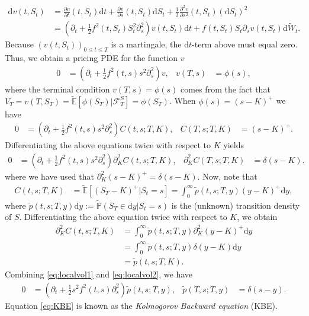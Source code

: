 \documentclass[12pt]{book}
\numberwithin{equation}{chapter}
\theoremstyle{plain}
\numberwithin{theorem}{section}
\theoremstyle{definition}
\numberwithin{exercise}{chapter}
\newcommand{\<}{\langle}
\renewcommand{\>}{\rangle}
\renewcommand{\(}{\left(}
\renewcommand{\)}{\right)}
\renewcommand{\[}{\left[}
\renewcommand{\]}{\right]}
\newcommand\Eb{\mathds{E}}
\newcommand\Pb{\mathds{P}}
\newcommand\Fc{\mathscr{F}}
\newcommand\del{\delta}
\newcommand\Ebt{\widetilde{\Eb}}
\newcommand\Pbt{\widetilde{\Pb}}
\newcommand\Wt{\widetilde{W}}
\renewcommand\d{\partial}
\newcommand\dd{\mathrm{d}}
\theoremstyle{definition}
\numberwithin{question}{section}
\newcommand\pt{\widetilde{p}}
\begin{document}
\begin{align}
\dd v(t,S_t) 
	&= \frac{\d v}{\d t} (t,S_t) \dd t + \frac{\d v}{\d s} (t,S_t) \dd S_t + \frac{1}{2} \frac{\d^2 v}{\d s^2}(t,S_t) ( \dd S_t )^2 \\
	&= \( \d_t + \frac{1}{2} f^2(t,S_t) S_t^2 \d_s^2 \) v(t,S_t) \dd t + f(t,S_t) S_t \d_s v(t,S_t) \dd \Wt_t .
\end{align}
Because $(v(t,S_t))_{0 \leq t \leq T}$ is a martingale, the $\dd t$-term above must equal zero. 
Thus, we obtain a pricing PDE for the function $v$
\begin{align}
0
	&=	\( \d_t + \frac{1}{2} f^2 (t,s) s^2 \d_s^2 \) v , &
v(T,s) 
	&= 	\phi(s) , \label{eq:local-vol-pde}
\end{align}
where the terminal condition $v(T,s) = \phi(s)$ comes from the fact that $V_T = v(T,S_T) = \Ebt[ \phi(S_T) | \Fc_T^S] = \phi(S_T)$.
When $\phi(s) = (s - K)^+$ we have  
\begin{align}
0
	&=	\( \d_t + \frac{1}{2} f^2 (t,s) s^2 \d_s^2 \) C(t,s;T,K) , &
C(T,s;T,K) 
	&= (s-K)^+.
\end{align}
Differentiating the above equations twice with respect to $K$ yields
\begin{align} \label{eq:localvol1}
0
	&=	\( \d_t + \frac{1}{2} f^2 (t,s) s^2 \d_s^2 \) \d_K^2 C(t,s;T,K) , &
\d_K^2 C(T,s;T,K) 
	&= \del (s-K) .
\end{align}
where we have used that $\d_K^2(s-K)^+ = \delta(s-K)$.
Now, note that 
\begin{align}
C(t,s;T,K)
	&= \Ebt [(S_T - K)^+ | S_t = s ]
	=		\int_0^\infty \pt (t,s;T,y) (y - K)^+ \dd y ,
\end{align}
where $\pt(t,s;T,y) \dd y := \Pbt (S_T \in \dd y | S_t = s )$ is the (unknown) transition density of $S$.
Differentiating the above equation twice with respect to $K$, we obtain
\begin{align} 
\d^2_K C(t,s;T,K) 
	&= \int_0^\infty \pt(t,s;T,y) \d_K^2 (y-K)^+ \dd y\\
	&= \int_0^\infty \pt(t,s;T,y) \delta(y-K) \dd y\\
	&= \pt (t,s;T,K) . \label{eq:localvol2}
\end{align}
Combining \eqref{eq:localvol1} and \eqref{eq:localvol2}, we have
\begin{align}
0
	&=	\(\d_t + \frac{1}{2} s^2 f^2(t,s) \d_{s}^2\) \pt (t,s;T,y) , &
\pt(T,s;T,y) 
	&= 	\delta(s-y) . \label{eq:KBE}
\end{align}
Equation \eqref{eq:KBE} is known as the \textit{Kolmogorov Backward equation} (KBE).
\end{document}
